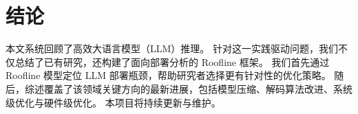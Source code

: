\section{结论}

本文系统回顾了高效大语言模型（LLM）推理。
针对这一实践驱动问题，我们不仅总结了已有研究，还构建了面向部署分析的 Roofline 框架。
我们首先通过 Roofline 模型定位 LLM 部署瓶颈，帮助研究者选择更有针对性的优化策略。
随后，综述覆盖了该领域关键方向的最新进展，包括模型压缩、解码算法改进、系统级优化与硬件级优化。
本项目将持续更新与维护。
